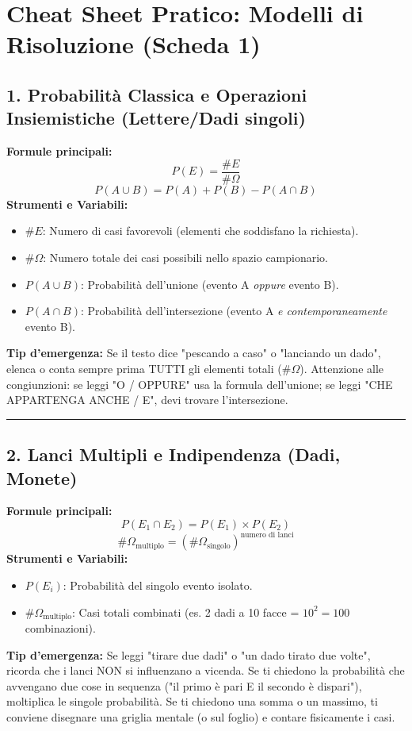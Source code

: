 \documentclass[12pt, a4paper]{article}
\begin{document}
\section*{Cheat Sheet Pratico: Modelli di Risoluzione (Scheda 1)}

\subsection*{1. Probabilità Classica e Operazioni Insiemistiche (Lettere/Dadi singoli)}
\textbf{Formule principali:}
$$ P(E) = \frac{\#E}{\#\Omega} $$
$$ P(A \cup B) = P(A) + P(B) - P(A \cap B) $$
\textbf{Strumenti e Variabili:}
\begin{itemize}
    \item $\#E$: Numero di casi favorevoli (elementi che soddisfano la richiesta).
    \item $\#\Omega$: Numero totale dei casi possibili nello spazio campionario.
    \item $P(A \cup B)$: Probabilità dell'unione (evento A \textit{oppure} evento B).
    \item $P(A \cap B)$: Probabilità dell'intersezione (evento A \textit{e contemporaneamente} evento B).
\end{itemize}
\textbf{Tip d'emergenza:} Se il testo dice "pescando a caso" o "lanciando un dado", elenca o conta sempre prima TUTTI gli elementi totali ($\#\Omega$). Attenzione alle congiunzioni: se leggi "O / OPPURE" usa la formula dell'unione; se leggi "CHE APPARTENGA ANCHE / E", devi trovare l'intersezione.

\vspace{0.3cm}\hrule\vspace{0.3cm}

\subsection*{2. Lanci Multipli e Indipendenza (Dadi, Monete)}
\textbf{Formule principali:}
$$ P(E_1 \cap E_2) = P(E_1) \times P(E_2) $$
$$ \#\Omega_{\text{multiplo}} = (\#\Omega_{\text{singolo}})^{\text{numero di lanci}} $$
\textbf{Strumenti e Variabili:}
\begin{itemize}
    \item $P(E_i)$: Probabilità del singolo evento isolato.
    \item $\#\Omega_{\text{multiplo}}$: Casi totali combinati (es. 2 dadi a 10 facce = $10^2 = 100$ combinazioni).
\end{itemize}
\textbf{Tip d'emergenza:} Se leggi "tirare due dadi" o "un dado tirato due volte", ricorda che i lanci NON si influenzano a vicenda. Se ti chiedono la probabilità che avvengano due cose in sequenza ("il primo è pari E il secondo è dispari"), moltiplica le singole probabilità. Se ti chiedono una somma o un massimo, ti conviene disegnare una griglia mentale (o sul foglio) e contare fisicamente i casi.
\end{document}
